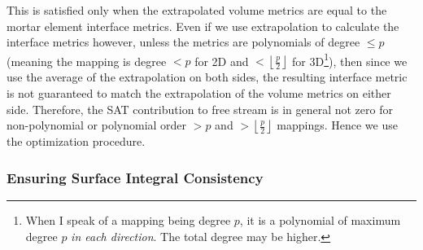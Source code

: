 \documentclass[12pt,a4paper]{article}
\begin{document}
This is satisfied only when the extrapolated volume metrics are equal to the mortar element interface metrics. Even if we use extrapolation to calculate the interface metrics however, unless the metrics are polynomials of degree $\leq p$ (meaning the mapping is degree $<p$ for 2D and $< \left\lfloor \frac{p}{2} \right\rfloor$ for 3D\footnote{When I speak of a mapping being degree $p$, it is a polynomial of maximum degree $p$ \textit{in each direction}. The total degree may be higher.}), then since we use the average of the extrapolation on both sides, the resulting interface metric is not guaranteed to match the extrapolation of the volume metrics on either side. Therefore, the SAT contribution to free stream is in general not zero for non-polynomial or polynomial order $>p$ and $> \left\lfloor \frac{p}{2} \right\rfloor$ mappings. Hence we use the optimization procedure.

\subsubsection{Ensuring Surface Integral Consistency}
\end{document}
